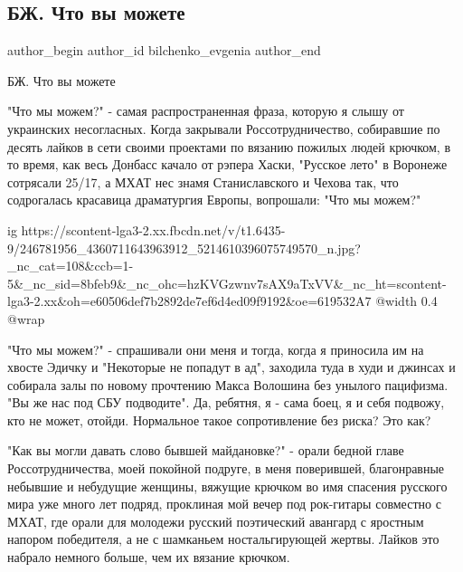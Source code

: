  
 
 
 
 
 
\subsection{БЖ. Что вы можете}
\label{sec:20_10_2021.fb.bilchenko_evgenia.3.chto_vy_mozhete}
 
\ifcmt
 author_begin
   author_id bilchenko_evgenia
 author_end
\fi

БЖ. Что вы можете

"Что мы можем?" - самая распространенная фраза, которую я слышу от украинских
несогласных. Когда закрывали Россотрудничество, собиравшие по десять лайков в
сети своими проектами по вязанию пожилых людей крючком, в то время, как весь
Донбасс качало от рэпера Хаски, "Русское лето" в Воронеже сотрясали 25/17, а
МХАТ нес знамя Станиславского и Чехова так, что содрогалась красавица
драматургия Европы, вопрошали: "Что мы можем?"

\ifcmt
  ig https://scontent-lga3-2.xx.fbcdn.net/v/t1.6435-9/246781956_4360711643963912_5214610396075749570_n.jpg?_nc_cat=108&ccb=1-5&_nc_sid=8bfeb9&_nc_ohc=hzKVGzwnv7sAX9aTxVV&_nc_ht=scontent-lga3-2.xx&oh=e60506def7b2892de7ef6d4ed09f9192&oe=619532A7
  @width 0.4
  @wrap 
\fi

"Что мы можем?" - спрашивали они меня и тогда, когда я приносила им на хвосте
Эдичку и "Некоторые не попадут в ад", заходила туда в худи и джинсах и собирала
залы по новому прочтению Макса Волошина без унылого пацифизма. "Вы же нас под
СБУ подводите". Да, ребятня, я - сама боец, я и себя подвожу, кто не может,
отойди. Нормальное такое сопротивление без риска? Это как? 

"Как вы могли давать слово бывшей майдановке?" - орали бедной главе
Россотрудничества, моей покойной подруге, в меня поверившей, благонравные
небывшие и небудущие женщины, вяжущие крючком во имя спасения русского мира уже
много лет подряд, проклиная мой вечер под рок-гитары совместно с МХАТ, где
орали для молодежи русский поэтический авангард с яростным напором победителя,
а не с шамканьем ностальгирующей жертвы. Лайков это набрало немного больше, чем
их  вязание крючком. 

